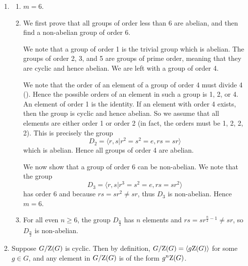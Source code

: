 \begin{enumerate}
    \item \begin{enumerate}[label=(\alph*)]
        \item $m = 6$.
        \item We first prove that all groups of order less than 6 are abelian, and then find a non-abelian group of order 6.

        We note that a group of order 1 is the trivial group which is abelian. The groups of order 2, 3, and 5 are groups of prime order, meaning that they are cyclic and hence abelian. We are left with a group of order 4.

        We note that the order of an element of a group of order 4 must divide 4 (). Hence the possible orders of an element in such a group is 1, 2, or 4. An element of order 1 is the identity. If an element with order 4 exists, then the group is cyclic and hence abelian. So we assume that all elements are either order 1 or order 2 (in fact, the orders must be 1, 2, 2, 2). This is precisely the group
        \[
            D_2 = \langle r, s \vert r^2 = s^2 = e, rs = sr\rangle
        \]
        which is abelian. Hence all groups of order 4 are abelian.

        We now show that a group of order 6 can be non-abelian. We note that the group
        \[
            D_3 =  \langle r, s \vert r^3 = s^2 = e, rs = sr^2\rangle
        \]
        has order 6 and because $rs = sr^2 \neq sr$, thus $D_3$ is non-abelian. Hence $m = 6$.

        \item For all even $n \geq 6$, the group $D_{\frac n2}$ has $n$ elements and $rs = sr^{\frac n2 - 1} \neq sr$, so $D_{\frac n2}$ is non-abelian.
    \end{enumerate}

    \item Suppose $G / \mathrm{Z}(G)$ is cyclic. Then by definition, $G / \mathrm{Z}(G) = \langle g\mathrm{Z}(G)\rangle$ for some $g \in G$, and any element in $G/\mathrm{Z}(G)$ is of the form $g^n\mathrm{Z}(G)$.


\end{enumerate}
